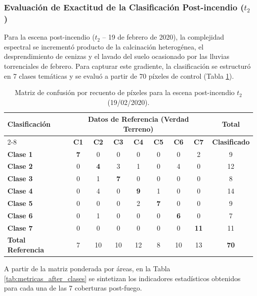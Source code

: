 \documentclass[12pt]{article}
\begin{document}
\subsubsection{Evaluación de Exactitud de la Clasificación Post-incendio ($t_2$)}

Para la escena post-incendio ($t_2$ -- 19 de febrero de 2020), la complejidad espectral se incrementó producto de la calcinación heterogénea, el desprendimiento de cenizas y el lavado del suelo ocasionado por las lluvias torrenciales de febrero. Para capturar este gradiente, la clasificación se estructuró en 7 clases temáticas y se evaluó a partir de 70 píxeles de control (Tabla \ref{tab:matriz_confusion_after}).

\begin{table}[H]
    \centering
    \caption{Matriz de confusión por recuento de píxeles para la escena post-incendio $t_2$ (19/02/2020).}
    \label{tab:matriz_confusion_after}
    \scriptsize
    \begin{tabular}{@{}lcccccccc@{}}
        \toprule
        \textbf{Clasificación} & \multicolumn{7}{c}{\textbf{Datos de Referencia (Verdad Terreno)}} & \textbf{Total} \\
        \cmidrule(lr){2-8}
        & \textbf{C1} & \textbf{C2} & \textbf{C3} & \textbf{C4} & \textbf{C5} & \textbf{C6} & \textbf{C7} & \textbf{Clasificado} \\
        \midrule
        \textbf{Clase 1} & \textbf{7} & 0 & 0 & 0 & 0 & 0 & 2 & 9 \\
        \textbf{Clase 2} & 0 & \textbf{4} & 3 & 1 & 0 & 4 & 0 & 12 \\
        \textbf{Clase 3} & 0 & 1 & \textbf{7} & 0 & 0 & 0 & 0 & 8 \\
        \textbf{Clase 4} & 0 & 4 & 0 & \textbf{9} & 1 & 0 & 0 & 14 \\
        \textbf{Clase 5} & 0 & 0 & 0 & 2 & \textbf{7} & 0 & 0 & 9 \\
        \textbf{Clase 6} & 0 & 1 & 0 & 0 & 0 & \textbf{6} & 0 & 7 \\
        \textbf{Clase 7} & 0 & 0 & 0 & 0 & 0 & 0 & \textbf{11} & 11 \\
        \midrule
        \textbf{Total Referencia} & 7 & 10 & 10 & 12 & 8 & 10 & 13 & \textbf{70} \\
        \bottomrule
    \end{tabular}
\end{table}

A partir de la matriz ponderada por áreas, en la Tabla \ref{tab:metricas_after_clases} se sintetizan los indicadores estadísticos obtenidos para cada una de las 7 coberturas post-fuego.
\end{document}
